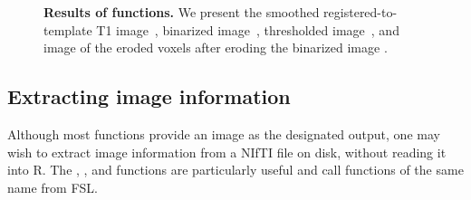 \begin{figure}
   \hspace*{-0.9em}
\hfill
   \hspace*{-0.9em}
\hfill
   \hspace*{-0.9em}
\hfill
\caption{{\bf Results of  functions.}  We present the smoothed registered-to-template T1 image~\protect{}, binarized image~\protect{}, thresholded image~\protect{}, and image of the eroded voxels after eroding the binarized image \protect{}.  }
\label{fig:fslr_func}
\end{figure}


\subsection{Extracting image information}
Although most  functions provide an image as the designated output, one may wish to extract image information from a NIfTI file on disk, without reading it into R.  The  , , and  functions are particularly useful and call functions of the same name from FSL.

